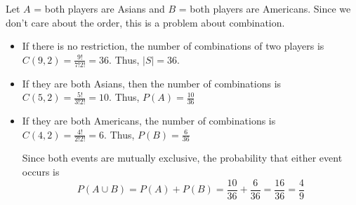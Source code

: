 \begin{frame}[t]
\begin{sol}
Let $A$ = both players are Asians and $B$ = both players are Americans. Since we don't care about the order, this is a problem about combination.
\begin{itemize}
\item If there is no restriction, the number of combinations of two players is $C(9,2) = \frac{9!}{7!2!} = 36$. Thus, $|S| = 36$. 
\item If they are both Asians, then the number of combinations is $C(5,2) = \frac{5!}{3!2!} = 10$. Thus, $P(A) = \frac{10}{36}$
\item If they are both Americans, the number of combinations is $C(4,2) = \frac{4!}{2!2!} = 6$. Thus, $P(B) = \frac{6}{36}$

Since both events are mutually exclusive, the probability that either event occurs is
\[ P(A \cup B) = P(A) + P(B) = \frac{10}{36} + \frac{6}{36} = \frac{16}{36} = \frac{4}{9}\]
\end{itemize}
\end{sol}
\end{frame}

